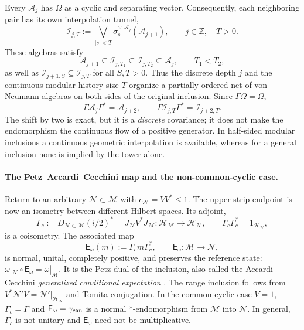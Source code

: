 \documentclass[a4paper,11pt]{article}
\theoremstyle{definition}
\newcommand{\mA}{\mathcal{A}}%
\newcommand{\mN}{\mathcal{N}}
\newcommand{\mI}{\mathcal{I}}
\newcommand{\mH}{\mathcal{H}}
\newcommand{\mM}{\mathcal{M}}
\begin{document}
Every $\mA_j$ has $\Omega$ as a cyclic and separating vector.
Consequently, each neighboring pair has its own interpolation tunnel,
\begin{equation}
 \boxed{\quad
 \mI_{j,T}:=
 \bigvee_{|s|<T}
 \sigma_s^{\omega;\mA_j}(\mA_{j+1}),
 \qquad j\in\mathbb Z,\quad T>0.
 \quad}
 \label{eq:interpolation-tower-net}
\end{equation}
These algebras satisfy
\begin{equation}
 \mA_{j+1}\subseteq\mI_{j,T_1}
 \subseteq\mI_{j,T_2}\subseteq\mA_j,
 \qquad T_1<T_2,
 \label{eq:interpolation-tower-net-order}
\end{equation}
as well as $\mI_{j+1,S}\subseteq\mI_{j,T}$ for all $S,T>0$.
Thus the discrete depth $j$ and the continuous modular-history size $T$
organize a partially ordered net of von Neumann algebras on both
sides of the original inclusion. Since $\Gamma\Omega=\Omega$,
\begin{equation}
 \boxed{\quad
 \Gamma\mA_j\Gamma^*=\mA_{j+2},\qquad
 \Gamma\mI_{j,T}\Gamma^*=\mI_{j+2,T}.
 \quad}
 \label{eq:interpolation-shift-covariance}
\end{equation}
The shift by two is exact, but it is a \emph{discrete} covariance;
it does not make the endomorphism the continuous flow of a positive
generator. In half-sided modular inclusions a continuous geometric
interpolation is available, whereas for a general inclusion none is
implied by the tower alone.

\paragraph{The Petz--Accardi--Cecchini map and the non-common-cyclic case.}
Return to an arbitrary $\mN\subset\mM$ with $e_{\mN}=VV^*\leq1$.
The upper-strip endpoint is now an isometry between different
Hilbert spaces. Its adjoint,
\begin{equation}
 \Gamma_c:=D_{\mN\subset\mM}(i/2)^*
 =J_{\mN}V^*J_{\mM}:\mH_{\mM}\longrightarrow\mH_{\mN},
 \qquad \Gamma_c\Gamma_c^*=1_{\mH_{\mN}},
 \label{eq:interpolation-Gamma-compressed}
\end{equation}
is a coisometry. The associated map
\begin{equation}
 \boxed{\quad
 \mathsf E_\omega(m):=\Gamma_c m\Gamma_c^*,
 \qquad \mathsf E_\omega:\mM\longrightarrow\mN,
 \quad}
 \label{eq:interpolation-Petz-map}
\end{equation}
is normal, unital, completely positive, and preserves the reference
state: $\omega|_{\mN}\circ\mathsf E_\omega=\omega|_{\mM}$.
It is the Petz dual of the inclusion, also called the
Accardi--Cecchini \emph{generalized conditional expectation}
\cite{Petz1988,AccardiCecchini1982}. The range inclusion follows
from $V^*\mN'V=\mN'|_{\mH_{\mN}}$ and Tomita conjugation.
In the common-cyclic case $V=1$, $\Gamma_c=\Gamma$ and
$\mathsf E_\omega=\gamma_{\rm can}$ is a normal $*$-endomorphism
from $\mM$ into $\mN$. In general, $\Gamma_c$ is not unitary
and $\mathsf E_\omega$ need not be multiplicative.
\end{document}
